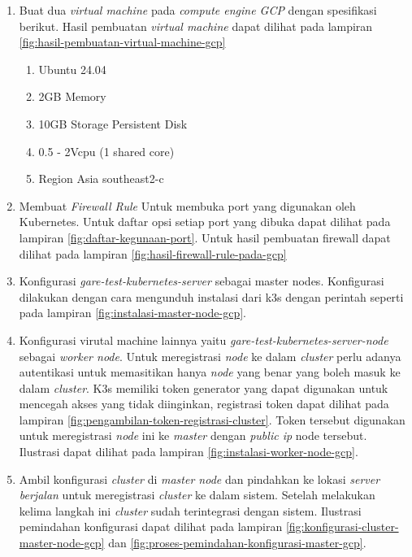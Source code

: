 \begin{enumerate}
  \item Buat dua \textit{virtual machine} pada \textit{compute engine GCP} dengan spesifikasi berikut. Hasil pembuatan \textit{virtual machine} dapat dilihat pada lampiran \ref{fig:hasil-pembuatan-virtual-machine-gcp}
        \begin{enumerate}
          \item Ubuntu 24.04
          \item 2GB Memory
          \item 10GB Storage Persistent Disk
          \item 0.5 - 2Vcpu (1 shared core)
          \item Region Asia southeast2-c
        \end{enumerate}
  \item Membuat \textit{Firewall Rule} Untuk membuka port yang digunakan oleh Kubernetes. Untuk daftar opsi setiap port yang dibuka dapat dilihat pada lampiran \ref{fig:daftar-kegunaan-port}. Untuk hasil pembuatan firewall dapat dilihat pada lampiran \ref{fig:hasil-firewall-rule-pada-gcp}
  \item Konfigurasi \textit{gare-test-kubernetes-server} sebagai master nodes. Konfigurasi dilakukan dengan cara mengunduh instalasi dari k3s dengan perintah seperti pada lampiran \ref{fig:instalasi-master-node-gcp}.
  \item Konfigurasi virutal machine lainnya yaitu \textit{gare-test-kubernetes-server-node} sebagai \textit{worker node}. Untuk meregistrasi \textit{node} ke dalam \textit{cluster} perlu adanya autentikasi untuk memasitikan hanya \textit{node} yang benar yang boleh masuk ke dalam \textit{cluster}. K3s memiliki token generator yang dapat digunakan untuk mencegah akses yang tidak diinginkan, registrasi token dapat dilihat pada lampiran \ref{fig:pengambilan-token-registrasi-cluster}. Token tersebut digunakan untuk meregistrasi \textit{node} ini ke \textit{master} dengan \textit{public ip} node tersebut. Ilustrasi dapat dilihat pada lampiran \ref{fig:instalasi-worker-node-gcp}.
  \item Ambil konfigurasi \textit{cluster} di \textit{master node} dan pindahkan ke lokasi \textit{server berjalan} untuk meregistrasi \textit{cluster} ke dalam sistem. Setelah melakukan kelima langkah ini \textit{cluster} sudah terintegrasi dengan sistem. Ilustrasi pemindahan konfigurasi dapat dilihat pada lampiran \ref{fig:konfigurasi-cluster-master-node-gcp} dan \ref{fig:proses-pemindahan-konfigurasi-master-gcp}.
\end{enumerate}

